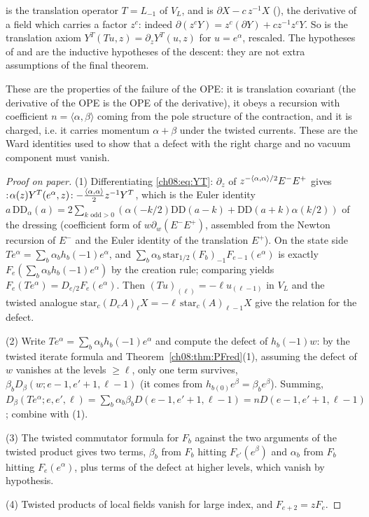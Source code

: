 \begin{dictionary}
 is the translation operator $T=L_{-1}$ of
$V_L$, and  is $\partial X-c\,z^{-1}X$ (),
the derivative of a field which carries a factor $z^c$: indeed
$\partial(z^cY)=z^c(\partial Y)+cz^{-1}z^cY$.  So  is the translation axiom
$Y^T(Tu,z)=\partial_zY^T(u,z)$ for $u=e^\alpha$, rescaled.  The hypotheses  of
 and  are the inductive hypotheses of the descent: they are not
extra assumptions of the final theorem.
\end{dictionary}

\begin{physics}
These are the properties of the failure of the OPE: it is translation covariant (the derivative of the OPE is the OPE of the derivative), it obeys a recursion with coefficient $n=\langle\alpha,\beta\rangle$ coming from the pole structure of the contraction, and it is charged, i.e. it carries momentum $\alpha+\beta$ under the twisted currents. These are the Ward identities used to show that a defect with the right charge and no vacuum component must vanish.
\end{physics}
\begin{proof}[Proof on paper]
(1) Differentiating \eqref{ch08:eq:YT}: $\partial_z$ of $z^{-\langle \alpha,\alpha\rangle/2}E^{-}E^{+}$
gives $:\!\alpha(z)Y^T(e^\alpha,z)\!:-\frac{\langle \alpha,\alpha\rangle}{2}z^{-1}Y^T$, which is the
Euler identity $a\,\mathrm{DD}_\alpha(a)=2\sum_{k\text{ odd}>0}(\alpha(-k/2)\mathrm{DD}(a-k)+\mathrm{DD}(a+k)\alpha(k/2))$
of the dressing (coefficient form of $w\partial_w(E^-E^+)$, assembled from the Newton recursion of
$E^-$ and the Euler identity of the translation $E^+$).  On the state side
$Te^\alpha=\sum_b\alpha_bh_b(-1)e^\alpha$, and $\sum_b\alpha_b\,\mathrm{star}_{1/2}(F_b)_{-1}F_{e-1}(e^\alpha)$
is exactly $F_e(\sum_b\alpha_bh_b(-1)e^\alpha)$ by the creation rule; comparing yields
$F_e(Te^\alpha)=D_{e/2}F_e(e^\alpha)$.  Then $(Tu)_{(\ell)}=-\ell u_{(\ell-1)}$ in $V_L$ and the
twisted analogue $\mathrm{star}_c(D_cA)_\ell X=-\ell\,\mathrm{star}_c(A)_{\ell-1}X$ give the
relation for the defect.

(2) Write $Te^\alpha=\sum_b\alpha_bh_b(-1)e^\alpha$ and compute the defect of $h_b(-1)w$: by the
twisted iterate formula and Theorem~\ref{ch08:thm:PFred}(1), assuming the defect of $w$ vanishes at
the levels $\ge\ell$, only one term survives, $\beta_bD_\beta(w;e-1,e'+1,\ell-1)$ (it comes from
$h_{b(0)}e^\beta=\beta_be^\beta$).  Summing, $D_\beta(Te^\alpha;e,e',\ell)=\sum_b\alpha_b\beta_b
D(e-1,e'+1,\ell-1)=nD(e-1,e'+1,\ell-1)$; combine with (1).

(3) The twisted commutator formula for $F_b$ against the two arguments of the twisted product
gives two terms, $\beta_b$ from $F_b$ hitting $F_{e'}(e^\beta)$ and $\alpha_b$ from $F_b$ hitting
$F_e(e^\alpha)$, plus terms of the defect at higher levels, which vanish by hypothesis.

(4) Twisted products of local fields vanish for large index, and $F_{e+2}=zF_e$.
\end{proof}
